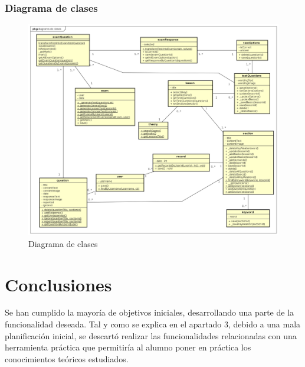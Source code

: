 \documentclass[openright,twoside,10pt]{book}
\begin{document}
    \vspace*{\fill} \newpage
    
    \subsection{Diagrama de clases}\label{diagrama-de-clases}
    
    \vspace*{\fill}
    
    \begin{figure}[H]
        \begin{center}
            \includegraphics[width=\textwidth, angle=-90]{img/astah/disenio/clases/clases.png}
        \end{center}
        \caption{Diagrama de clases}
    \end{figure}
    
    \vspace*{\fill} \newpage
    
    \chapter{ Conclusiones }
    
    Se han cumplido la mayoría de objetivos iniciales, desarrollando una
    parte de la funcionalidad deseada. Tal y como se explica en el apartado
    3, debido a una mala planificación inicial, se descartó realizar las
    funcionalidades relacionadas con una herramienta práctica que permitiría
    al alumno poner en práctica los conocimientos teóricos estudiados.
    
\end{document}
